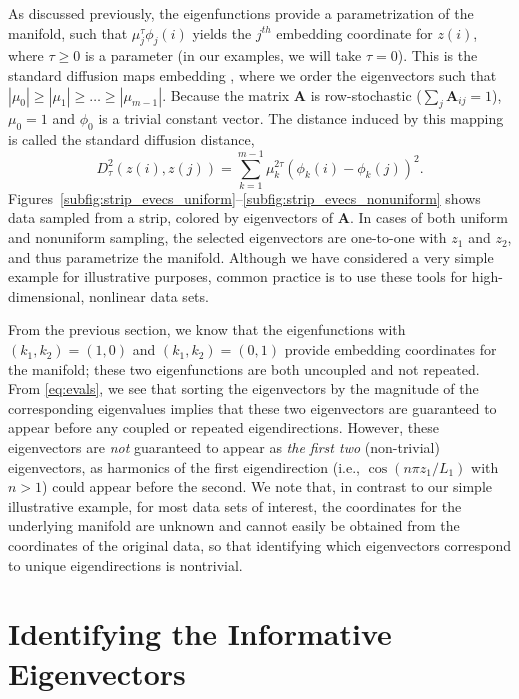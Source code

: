 \documentclass[3p]{elsarticle}
\begin{document}
As discussed previously, the eigenfunctions provide a parametrization of the manifold,
such that $\mu_j^\tau \phi_{j}(i)$ yields the $j^{th}$ embedding coordinate for $z(i)$, where $\tau \ge 0$ is
a parameter (in our examples, we will take $\tau=0$).
%
This is the standard diffusion maps embedding \cite{coifman2005geometric, coifman2006geometric}, where
we order the eigenvectors such that $|\mu_0| \ge |\mu_1| \ge \dots \ge |\mu_{m-1}|$.
%
Because the matrix $\mathbf{A}$ is row-stochastic ($\sum_j \mathbf{A}_{ij} = 1$),  $\mu_0 = 1$ and $\phi_0$ is a trivial constant vector.
%
The distance induced by this mapping is called the standard diffusion distance,
%
\begin{equation}
D^2_\tau(z(i), z(j)) = \sum_{k=1}^{m-1} \mu_k^{2 \tau} \left( \phi_k(i) - \phi_k(j)  \right)^2.
\end{equation}
%
Figures~\ref{subfig:strip_evecs_uniform}--\ref{subfig:strip_evecs_nonuniform} shows
data sampled from a strip, colored by eigenvectors of $\mathbf{A}$.
%
In cases of both uniform and nonuniform sampling, the selected eigenvectors are one-to-one with $z_1$ and $z_2$,
and thus parametrize the manifold.
%
%
Although we have considered a very simple example for illustrative purposes, common practice is to use these tools for high-dimensional, nonlinear data sets.

From the previous section, we know that the eigenfunctions with $(k_1, k_2) =(1, 0)$ and $(k_1, k_2) =(0, 1)$
provide embedding coordinates for the manifold; these two eigenfunctions are both uncoupled and not repeated.
%
From \eqref{eq:evals}, we see that sorting the eigenvectors by the magnitude of
the corresponding eigenvalues implies that these two eigenvectors are guaranteed to
appear before any coupled or repeated eigendirections.
%
However, these eigenvectors are {\em not} guaranteed to appear as {\em the first two} (non-trivial) eigenvectors,
as harmonics of the first eigendirection (i.e., $\cos \left( n \pi z_1 / L_1 \right)$ with $n > 1$) could appear before the second.
%
We note that, in contrast to our simple illustrative example, for most data sets of interest, the coordinates for the underlying manifold are unknown and cannot easily be obtained from the coordinates of the original data, so that identifying which eigenvectors correspond to unique eigendirections is nontrivial.

\section{Identifying the Informative Eigenvectors }
\end{document}
